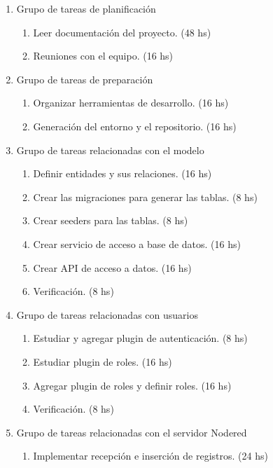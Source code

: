 \documentclass[11pt]{charter}
\begin{document}
\begin{enumerate}
\item Grupo de tareas de planificación
	\begin{enumerate}
	\item Leer documentación del proyecto. (48 hs)
	\item Reuniones con el equipo. (16 hs)
	\end{enumerate}

\item Grupo de tareas de preparación
	\begin{enumerate}
	\item Organizar herramientas de desarrollo. (16 hs)
	\item Generación del entorno y el repositorio. (16 hs)
	\end{enumerate}

\item Grupo de tareas relacionadas con el modelo
	\begin{enumerate}
	\item Definir entidades y sus relaciones. (16 hs)
	\item Crear las migraciones para generar las tablas. (8 hs)
	\item Crear seeders para las tablas. (8 hs)
	\item Crear servicio de acceso a base de datos. (16 hs)
	\item Crear API de acceso a datos. (16 hs)
	\item Verificación. (8 hs)
	\end{enumerate}

\item Grupo de tareas relacionadas con usuarios
	\begin{enumerate}
	\item Estudiar y agregar plugin de autenticación. (8 hs)
	\item Estudiar plugin de roles. (16 hs)
	\item Agregar plugin de roles y definir roles. (16 hs)
	\item Verificación. (8 hs)
	\end{enumerate}

\item Grupo de tareas relacionadas con el servidor Nodered
	\begin{enumerate}
	\item Implementar recepción e inserción de registros. (24 hs)
	\end{enumerate}


\end{enumerate}
\end{document}
